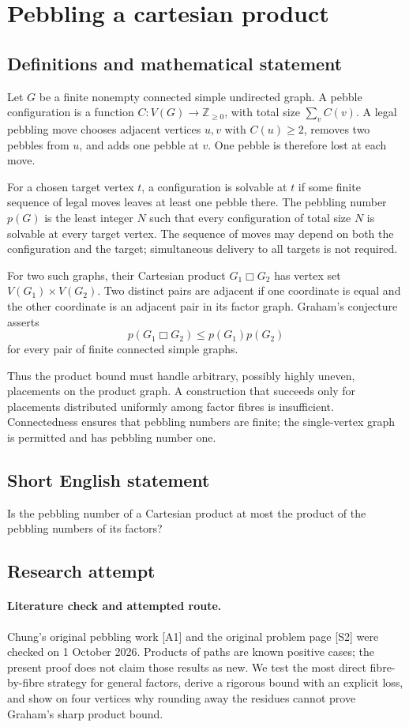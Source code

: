 \documentclass[11pt,a4paper]{article}
\begin{document}
\section*{Pebbling a cartesian product}\label{statement}

\subsection{Definitions and mathematical statement}
Let $G$ be a finite nonempty connected simple undirected graph.
A pebble configuration is a function $C:V(G)\to\mathbb Z_{\ge0}$,
with total size $\sum_v C(v)$. A legal pebbling move chooses adjacent
vertices $u,v$ with $C(u)\ge2$, removes two pebbles from $u$, and adds
one pebble at $v$. One pebble is therefore lost at each move.

For a chosen target vertex $t$, a configuration is solvable at $t$ if
some finite sequence of legal moves leaves at least one pebble there.
The pebbling number $p(G)$ is the least integer $N$ such that every
configuration of total size $N$ is solvable at every target vertex.
The sequence of moves may depend on both the configuration and the
target; simultaneous delivery to all targets is not required.

For two such graphs, their Cartesian product $G_1\mathbin\Box G_2$ has
vertex set $V(G_1)\times V(G_2)$. Two distinct pairs are adjacent if
one coordinate is equal and the other coordinate is an adjacent pair
in its factor graph.
Graham's conjecture asserts
\[
 p(G_1\mathbin\Box G_2)\le p(G_1)p(G_2)
\]
for every pair of finite connected simple graphs.

Thus the product bound must handle arbitrary, possibly highly uneven,
placements on the product graph. A construction that succeeds only for
placements distributed uniformly among factor fibres is insufficient.
Connectedness ensures that pebbling numbers are finite; the single-vertex
graph is permitted and has pebbling number one.
\subsection{Short English statement}
Is the pebbling number of a Cartesian product at most the product of the pebbling numbers of its factors?
\subsection{Research attempt}
\paragraph{Literature check and attempted route.}
Chung's original pebbling work [A1] and the original problem page [S2] were
checked on 1 October 2026. Products of paths are known positive cases; the
present proof does not claim those results as new. We test the most direct
fibre-by-fibre strategy for general factors, derive a rigorous bound with
an explicit loss, and show on four vertices why rounding away the residues
cannot prove Graham's sharp product bound.
\end{document}
